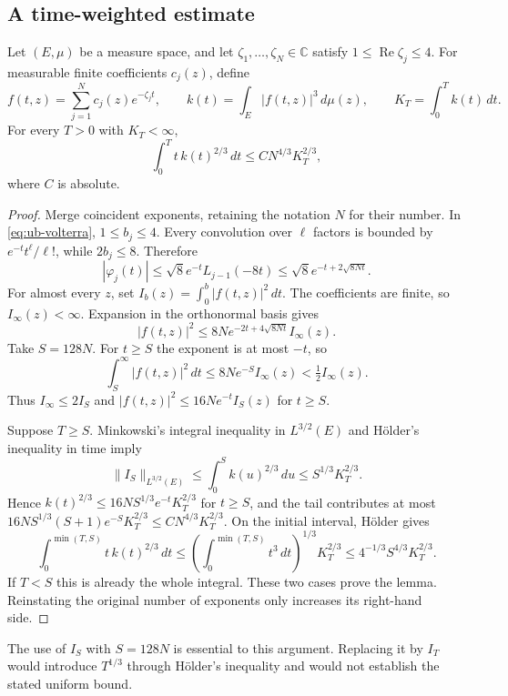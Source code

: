 \subsection{A time-weighted estimate}

\begin{lemma}\label{lem:ub-delay}
Let $(E,\mu)$ be a measure space, and let
$\zeta_1,\ldots,\zeta_N\in\mathbb C$ satisfy
$1\le\operatorname{Re}\zeta_j\le4$.  For measurable finite
coefficients $c_j(z)$, define
\[
 f(t,z)=\sum_{j=1}^N c_j(z)e^{-\zeta_jt},\qquad
 k(t)=\int_E|f(t,z)|^3\,d\mu(z),\qquad
 K_T=\int_0^T k(t)\,dt.
\]
For every $T>0$ with $K_T<\infty$,
\begin{equation}\label{eq:ub-delay}
 \int_0^T t\,k(t)^{2/3}\,dt\le C N^{4/3}K_T^{2/3},
\end{equation}
where $C$ is absolute.
\end{lemma}

\begin{proof}
Merge coincident exponents, retaining the notation $N$ for their number.
In \eqref{eq:ub-volterra}, $1\le b_j\le4$.  Every convolution over
$\ell$ factors is bounded by $e^{-t}t^\ell/\ell!$, while $2b_j\le8$.
Therefore
\[
 |\varphi_j(t)|\le\sqrt8 e^{-t}L_{j-1}(-8t)
              \le\sqrt8 e^{-t+2\sqrt{8Nt}}.
\]
For almost every $z$, set $I_b(z)=\int_0^b|f(t,z)|^2\,dt$.
The coefficients are finite, so $I_\infty(z)<\infty$.
Expansion in the orthonormal basis gives
\[
 |f(t,z)|^2\le8N e^{-2t+4\sqrt{8Nt}}I_\infty(z).
\]
Take $S=128N$.  For $t\ge S$ the exponent is at most $-t$, so
\[
 \int_S^\infty|f(t,z)|^2\,dt
 \le8Ne^{-S}I_\infty(z)<\tfrac12 I_\infty(z).
\]
Thus $I_\infty\le2I_S$ and
$|f(t,z)|^2\le16Ne^{-t}I_S(z)$ for $t\ge S$.

Suppose $T\ge S$.  Minkowski's integral inequality in $L^{3/2}(E)$
and H\"older's inequality in time imply
\[
 \|I_S\|_{L^{3/2}(E)}
 \le\int_0^S k(u)^{2/3}\,du\le S^{1/3}K_T^{2/3}.
\]
Hence $k(t)^{2/3}\le16NS^{1/3}e^{-t}K_T^{2/3}$ for $t\ge S$,
and the tail contributes at most
$16NS^{1/3}(S+1)e^{-S}K_T^{2/3}\le C N^{4/3}K_T^{2/3}$.
On the initial interval, H\"older gives
\[
 \int_0^{\min(T,S)}t\,k(t)^{2/3}\,dt
 \le\left(\int_0^{\min(T,S)}t^3\,dt\right)^{1/3}K_T^{2/3}
 \le4^{-1/3}S^{4/3}K_T^{2/3}.
\]
If $T<S$ this is already the whole integral.  These two cases prove the
lemma.  Reinstating the original number of exponents only increases its
right-hand side.
\end{proof}

The use of $I_S$ with $S=128N$ is essential to this argument.  Replacing
it by $I_T$ would introduce $T^{1/3}$ through H\"older's inequality and
would not establish the stated uniform bound.

